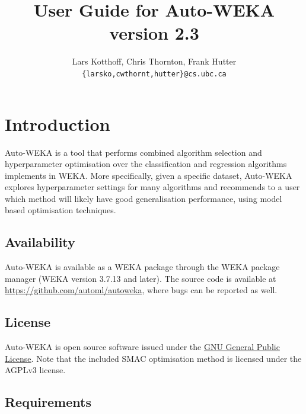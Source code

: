 \documentclass{article}
\def\version{2.3}
\begin{document}
\title{User Guide for Auto-WEKA version \version}

\author{
Lars Kotthoff, Chris Thornton, Frank Hutter\\
\texttt{\{larsko,cwthornt,hutter\}@cs.ubc.ca}
}

\maketitle

\tableofcontents

\section{Introduction}\label{sec:intro}

Auto-WEKA is a tool that performs combined algorithm selection and hyperparameter
optimisation over the classification and regression algorithms implements in
WEKA. More specifically, given a specific dataset, Auto-WEKA explores
hyperparameter settings for many algorithms and recommends to a user which
method will likely have good generalisation performance, using model based
optimisation techniques.

\subsection{Availability}

Auto-WEKA is available as a WEKA package through the WEKA package manager (WEKA
version 3.7.13 and later). The source code is available at
\url{https://github.com/automl/autoweka}, where bugs can be reported as
well.

\subsection{License}

Auto-WEKA is open source software issued under the
\href{http://www.gnu.org/licenses/gpl.html}{GNU General Public License}. Note
that the included SMAC optimisation method is licensed under the AGPLv3 license.

\subsection{Requirements}
\end{document}
